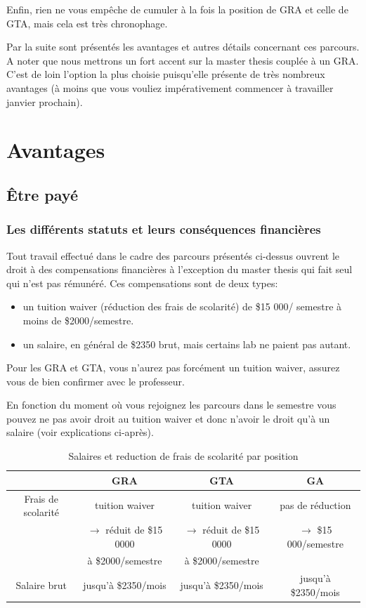 \documentclass{article}
\begin{document}
Enfin, rien ne vous empêche de cumuler à la fois la position de GRA et celle de GTA, mais cela est très chronophage.

Par la suite sont présentés les avantages et autres détails concernant ces parcours. A noter que nous mettrons un fort accent sur la master thesis couplée à un GRA. C'est de loin l'option la plus choisie puisqu'elle présente de très nombreux avantages (à moins que vous vouliez impérativement commencer à travailler janvier prochain). 


\section{Avantages}
\subsection{Être payé \label{Etre paye}}
\subsubsection{Les différents statuts et leurs conséquences financières }Tout travail effectué dans le cadre des parcours présentés ci-dessus ouvrent le droit à des compensations financières à l'exception du master thesis qui fait seul qui n'est pas rémunéré. Ces compensations sont de deux types:
\begin{itemize}
\item un tuition waiver (réduction des frais de scolarité) de \$15 000/ semestre à moins de \$2000/semestre.
\item un salaire, en général de \$2350 brut, mais certains lab ne paient pas autant. 
\end{itemize}

Pour les GRA et GTA, vous n'aurez pas forcément un tuition waiver, assurez vous de bien confirmer avec le professeur. 

En fonction du moment où vous rejoignez les parcours dans le semestre vous pouvez ne pas avoir droit au tuition waiver et donc n'avoir le droit qu'à un salaire (voir explications ci-après). 


\begin{table}[h]
\begin{center}
\begin{tabular}{|c|c|c|c|}
\hline
 &  GRA &  GTA  & GA \\
\hline
Frais de scolarité & tuition waiver & tuition waiver & pas de réduction  \\
& $\rightarrow$ réduit de \$15 0000 & $\rightarrow$ réduit de \$15 0000 & $\rightarrow$ \$15 000/semestre \\
&à \$2000/semestre&à \$2000/semestre&\\
\hline Salaire brut & jusqu'à  \$2350/mois & jusqu'à  \$2350/mois & jusqu'à \$2350/mois \\
\hline
\end{tabular}
\end{center}
\caption{Salaires et reduction de frais de scolarité par position}
\label{Salaires et reduction de frais de scolarité par position}
\end{table}
\end{document}
